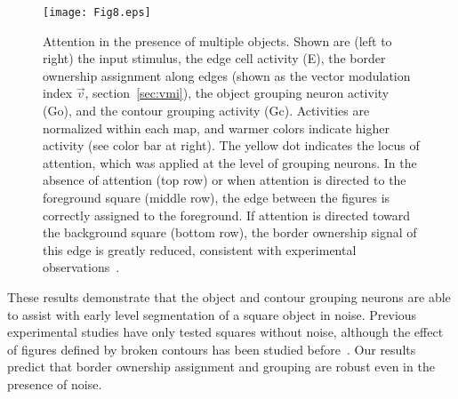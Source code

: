 {\begin{figure}
\begin{center}
\texttt{[image: Fig8.eps]}
\end{center}
\caption{Attention in the presence of multiple objects. Shown are
  (left to right) the input stimulus, the edge cell activity (E), the
  border ownership assignment along edges (shown as the vector
  modulation index $\vec{v}$, section~\ref{sec:vmi}), the object
  grouping neuron activity (Go), and the contour grouping activity
  (Gc). Activities are normalized within each map, and warmer colors
  indicate higher activity (see color bar at right). The yellow dot indicates the locus of attention, which was applied at the level of grouping neurons. In
  the absence of attention (top row) or when attention is directed to
  the foreground square (middle row), the edge between the figures is
  correctly assigned to the foreground. If attention is directed
  toward the background square (bottom row), the border ownership
  signal of this edge is greatly reduced, consistent with experimental
  observations~\citep{Qiu_etal07}.}
\label{Fig:Overlap_Square}
\end{figure}

These results demonstrate 
that the
object and contour grouping neurons  
are able to assist with
early level segmentation of a square object in noise.
Previous experimental studies have only tested squares
without noise, although the effect of figures defined by broken contours has been studied before~\citep{Zhang_vonderHeydt10}.
Our results predict that
border ownership assignment and grouping are robust even in the
presence of noise.

}
